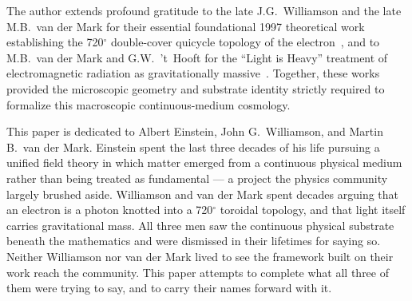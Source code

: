 \documentclass[aps,prd,twocolumn,superscriptaddress,amsmath,amssymb,nofootinbib,floatfix]{revtex4-2}
\begin{document}
\begin{acknowledgments}
\end{acknowledgments}

The author extends profound gratitude to the late J.G.\ Williamson and the late M.B.\ van der Mark for their essential foundational 1997 theoretical work establishing the 720$^{\circ}$ double-cover quicycle topology of the electron~\cite{WilliamsonVanDerMark1997}, and to M.B.\ van der Mark and G.W.\ 't~Hooft for the ``Light is Heavy'' treatment of electromagnetic radiation as gravitationally massive~\cite{LightIsHeavy}. Together, these works provided the microscopic geometry and substrate identity strictly required to formalize this macroscopic continuous-medium cosmology.

This paper is dedicated to Albert Einstein, John G.\ Williamson, and Martin B.\ van der Mark. Einstein spent the last three decades of his life pursuing a unified field theory in which matter emerged from a continuous physical medium rather than being treated as fundamental --- a project the physics community largely brushed aside. Williamson and van der Mark spent decades arguing that an electron is a photon knotted into a 720$^{\circ}$ toroidal topology, and that light itself carries gravitational mass. All three men saw the continuous physical substrate beneath the mathematics and were dismissed in their lifetimes for saying so. Neither Williamson nor van der Mark lived to see the framework built on their work reach the community. This paper attempts to complete what all three of them were trying to say, and to carry their names forward with it.
\end{document}
